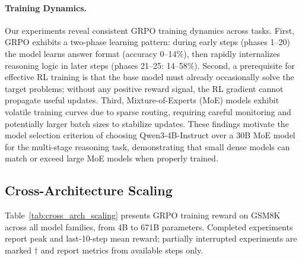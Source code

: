 \documentclass{article}
\begin{document}
\paragraph{Training Dynamics.}
Our experiments reveal consistent GRPO training dynamics across tasks.
First, GRPO exhibits a two-phase learning pattern: during early steps (phases
1--20) the model learns answer format (accuracy 0--14\%), then rapidly
internalizes reasoning logic in later steps (phases 21--25: 14--58\%).
Second, a prerequisite for effective RL training is that the base model must
already occasionally solve the target problems; without any positive reward
signal, the RL gradient cannot propagate useful updates. Third, Mixture-of-Experts
(MoE) models exhibit volatile training curves due to sparse routing, requiring
careful monitoring and potentially larger batch sizes to stabilize updates.
These findings motivate the model selection criterion of choosing Qwen3-4B-Instruct
over a 30B MoE model for the multi-stage reasoning task, demonstrating that
small dense models can match or exceed large MoE models when properly trained.

\subsection{Cross-Architecture Scaling}
\label{sec:cross_arch_scaling}

Table~\ref{tab:cross_arch_scaling} presents GRPO training reward on GSM8K across
all model families, from 4B to 671B parameters. Completed experiments report
peak and last-10-step mean reward; partially interrupted experiments are
marked $\dagger$ and report metrics from available steps only.
\end{document}
